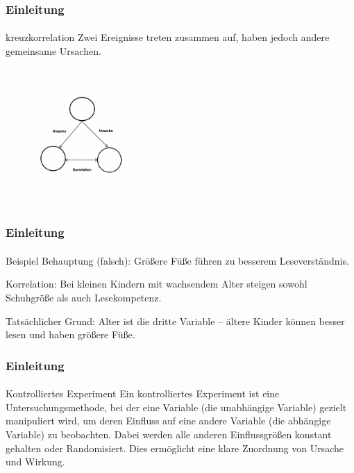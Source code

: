 \documentclass{beamer}
\begin{document}
\begin{frame}
    \frametitle{Einleitung}
\framesubtitle{}

    \begin{block}{kreuzkorrelation}
Zwei Ereignisse treten zusammen auf, haben jedoch andere gemeinsame Ursachen.
\end{block}


\begin{figure}[htp]
      \centering
    \includegraphics[width=0.33\textwidth]{img/kreuzkorrelation-2.png}

\end{figure}
\end{frame}



\begin{frame}
    \frametitle{Einleitung}
\framesubtitle{}

\begin{block}{Beispiel}
    Behauptung (falsch): Größere Füße führen zu besserem Leseverständnis.

Korrelation: Bei kleinen Kindern mit wachsendem Alter steigen sowohl Schuhgröße als auch Lesekompetenz.

Tatsächlicher Grund: Alter ist die dritte Variable – ältere Kinder können besser lesen und haben größere Füße.

\end{block}


\end{frame}


\begin{frame}
    \frametitle{Einleitung}
\framesubtitle{}

\begin{block}{Kontrolliertes Experiment}
    Ein kontrolliertes Experiment ist eine Untersuchungsmethode, 
    bei der eine Variable (die unabhängige Variable) gezielt manipuliert wird, 
    um deren Einfluss auf eine andere Variable (die abhängige Variable) zu beobachten. 
    Dabei werden alle anderen Einflussgrößen konstant gehalten oder   Randomisiert.
    Dies ermöglicht eine klare Zuordnung von Ursache und Wirkung.    
\end{block}


\end{frame}
\end{document}
